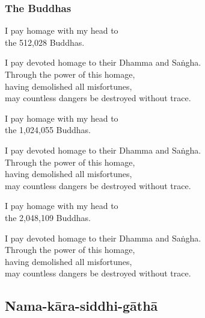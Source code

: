 \clearpage

\subsubsection{The Buddhas}


I pay homage with my head to\\
the 512,028 Buddhas.

I pay devoted homage to their Dhamma and Saṅgha.\\
Through the power of this homage,\\
having demolished all misfortunes,\\
may countless dangers be destroyed without trace.

I pay homage with my head to\\
the 1,024,055 Buddhas.

I pay devoted homage to their Dhamma and Saṅgha.\\
Through the power of this homage,\\
having demolished all misfortunes,\\
may countless dangers be destroyed without trace.

I pay homage with my head to\\
the 2,048,109 Buddhas.

I pay devoted homage to their Dhamma and Saṅgha.\\
Through the power of this homage,\\
having demolished all misfortunes,\\
may countless dangers be destroyed without trace.

\subsection{Nama-kāra-siddhi-gāthā}
\label{yo-cakkhuma}


